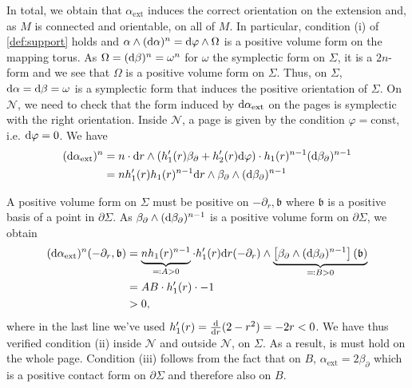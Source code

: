 In total, we obtain that $\alpha_\text{ext}$ induces the correct orientation on the extension and,
as $M$ is connected and orientable, on all of $M$.
In particular, condition (i) of \cref{def:support} holds and $\alpha \wedge (\mathrm{d} \alpha)^n = \mathrm{d} \varphi \wedge \Omega$ is a positive volume form on the mapping torus. As $\Omega = (\mathrm{d} \beta)^n = \omega^n$ for $\omega$ the symplectic form on $\Sigma$, it is a $2n$-form and we see that $\Omega$ is a positive volume form on $\Sigma$. Thus, on $\Sigma$, $\mathrm{d} \alpha = \mathrm{d} \beta = \omega$ is a symplectic form that induces the positive orientation of $\Sigma$. 
On $\mathcal{N}$, we need to check that the form induced by $\mathrm{d} \alpha_\text{ext}$ on the pages is symplectic with the right orientation.
Inside $\mathcal{N}$, a page is given by the condition $\varphi = \mathrm{const}$, i.e. $\mathrm{d} \varphi = 0$.
We have
\begin{align*}
    (\mathrm{d} \alpha_\text{ext})^n &= n\cdot \mathrm{d} r\wedge (h_1'(r) \beta_\partial + h_2'(r) \mathrm{d}\varphi) \cdot h_1(r)^{n-1}(\mathrm{d} \beta_\partial)^{n-1}\\
    &= n h_1'(r)h_1(r)^{n-1} \mathrm{d} r \wedge \beta_\partial \wedge (\mathrm{d} \beta_\partial)^{n-1}
\end{align*}

A positive volume form on $\Sigma$ must be positive on $- \partial_r, \mathfrak{b}$ where $\mathfrak{b}$ is a positive basis of a point in $\partial \Sigma$.
As $\beta_\partial \wedge (\mathrm{d} \beta_\partial)^{n-1}$ is a positive volume form on $\partial \Sigma$, we obtain
\begin{align*}
    (\mathrm{d} \alpha_\text{ext})^n(- \partial_r, \mathfrak{b}) &= \underbrace{n h_1(r)^{n-1}}_{\eqqcolon A > 0} \cdot h_1'(r) \mathrm{d} r(-\partial_r) \wedge \underbrace{\left[\beta_\partial \wedge (\mathrm{d} \beta_\partial)^{n-1}\right](\mathfrak{b})}_{\eqqcolon B > 0}\\
    &= AB \cdot h_1'(r) \cdot -1\\
    &> 0,
\end{align*}
where in the last line we've used $h_1'(r) = \frac{\mathrm{d}}{\mathrm{d} r}(2 - r^2) = -2r < 0$.
We have thus verified condition (ii) inside $\mathcal{N}$ and outside $\mathcal{N}$, on $\Sigma$. As a result, is must hold on the whole page.
Condition (iii) follows from the fact that on $B$, $\alpha_\text{ext} = 2 \beta_\partial$ which is a positive contact form on $\partial \Sigma$ and therefore also on $B$.
